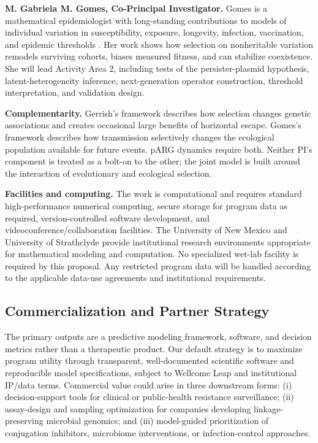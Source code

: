 \documentclass[12pt,a4paper]{article}
\begin{document}
\textbf{M. Gabriela M. Gomes, Co-Principal Investigator.} Gomes is a mathematical epidemiologist with long-standing contributions to models of individual variation in susceptibility, exposure, longevity, infection, vaccination, and epidemic thresholds \citep{gomes2004,gomes2019variation,gomes2022,gomes2024}. Her work shows how selection on nonheritable variation remodels surviving cohorts, biases measured fitness, and can stabilize coexistence. She will lead Activity Area 2, including tests of the persister-plasmid hypothesis, latent-heterogeneity inference, next-generation operator construction, threshold interpretation, and validation design.

\textbf{Complementarity.} Gerrish's framework describes how selection changes genetic associations and creates occasional large benefits of horizontal escape. Gomes's framework describes how transmission selectively changes the ecological population available for future events. pARG dynamics require both. Neither PI's component is treated as a bolt-on to the other; the joint model is built around the interaction of evolutionary and ecological selection.

\textbf{Facilities and computing.} The work is computational and requires standard high-performance numerical computing, secure storage for program data as required, version-controlled software development, and videoconference/collaboration facilities. The University of New Mexico and University of Strathclyde provide institutional research environments appropriate for mathematical modeling and computation. No specialized wet-lab facility is required by this proposal. Any restricted program data will be handled according to the applicable data-use agreements and institutional requirements.

\subsection*{Commercialization and Partner Strategy}

The primary outputs are a predictive modeling framework, software, and decision metrics rather than a therapeutic product. Our default strategy is to maximize program utility through transparent, well-documented scientific software and reproducible model specifications, subject to Wellcome Leap and institutional IP/data terms. Commercial value could arise in three downstream forms: (i) decision-support tools for clinical or public-health resistance surveillance; (ii) assay-design and sampling optimization for companies developing linkage-preserving microbial genomics; and (iii) model-guided prioritization of conjugation inhibitors, microbiome interventions, or infection-control approaches.
\end{document}
